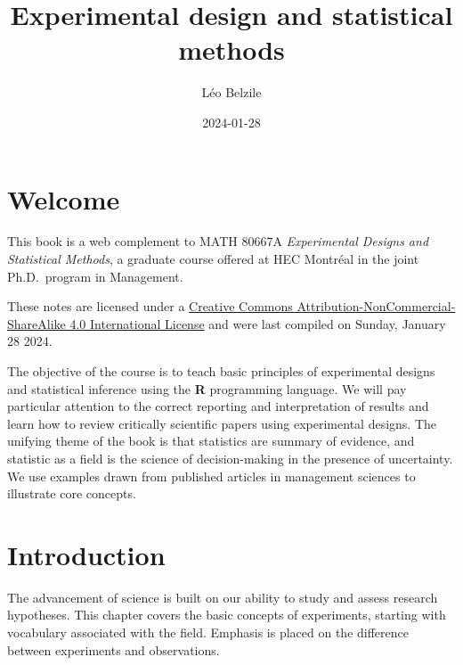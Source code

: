 \documentclass[
  11pt,
  letterpaper,
]{scrbook}
\title{Experimental design and statistical methods}
\author{Léo Belzile}
\date{2024-01-28}
\renewcommand*\contentsname{Table of contents}
\newcommand\contentsname{Table of contents}
\theoremstyle{definition}
\theoremstyle{remark}
\begin{document}


\ifdefined\Shaded\renewenvironment{Shaded}{\begin{tcolorbox}[sharp corners, enhanced, interior hidden, frame hidden, boxrule=0pt, breakable, borderline west={3pt}{0pt}{shadecolor}]}{\end{tcolorbox}}\fi

\renewcommand*\contentsname{Table of contents}
{
\setcounter{tocdepth}{2}
\tableofcontents
}
\mainmatter
{}

\hypertarget{welcome}{%
\chapter*{Welcome}\label{welcome}}


This book is a web complement to MATH 80667A \emph{Experimental Designs
and Statistical Methods}, a graduate course offered at HEC Montréal in
the joint Ph.D.~program in Management.

These notes are licensed under a
\href{http://creativecommons.org/licenses/by-nc-sa/4.0/}{Creative
Commons Attribution-NonCommercial-ShareAlike 4.0 International License}
and were last compiled on Sunday, January 28 2024.

The objective of the course is to teach basic principles of experimental
designs and statistical inference using the \textbf{R} programming
language. We will pay particular attention to the correct reporting and
interpretation of results and learn how to review critically scientific
papers using experimental designs. The unifying theme of the book is
that statistics are summary of evidence, and statistic as a field is the
science of decision-making in the presence of uncertainty. We use
examples drawn from published articles in management sciences to
illustrate core concepts.


\hypertarget{introduction}{%
\chapter{Introduction}\label{introduction}}

The advancement of science is built on our ability to study and assess
research hypotheses. This chapter covers the basic concepts of
experiments, starting with vocabulary associated with the field.
Emphasis is placed on the difference between experiments and
observations.
\end{document}
